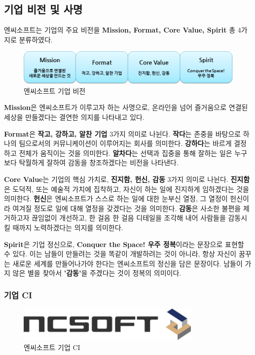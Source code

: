 \documentclass[11pt]{oblivoir}
\begin{document}
		\subsection{기업 비전 및 사명}
			엔씨소프트는 기업의 주요 비전을 \textbf{Mission, Format, Core Value, Spirit} 총 4가지로 분류하였다. 
			\begin{figure}[htbp]
				\centering
				\includegraphics[width=1\textwidth]{vision.png}
				\caption{엔씨소프트 기업 비전}
			\end{figure}

			\textbf{Mission}은 엔씨소프트가 이루고자 하는 사명으로, 온라인을 넘어 즐거움으로 연결된 세상을 만들겠다는 결연한 의지를 나타내고 있다.
			
			\textbf{Format}은 \textbf{작고, 강하고, 알찬 기업} 3가지 의미로 나뉜다. 
			\textbf{작다}는 존중을 바탕으로 하나의 팀으로서의 커뮤니케이션이 이루어지는 회사를 의미한다. \textbf{강하다}는 바르게 결정하고 전체가 움직이는 것을 의미한다. \textbf{알차다}는 선택과 집중을 통해 잘하는 일은 누구보다 탁월하게 잘하여 감동을 창조하겠다는 비전을 나타낸다.
			
			\textbf{Core Value}는 기업의 핵심 가치로, \textbf{진지함, 헌신, 감동} 3가지 의미로 나뉜다. \textbf{진지함}은 도덕적, 또는 예술적 가치에 집착하고, 자신이 하는 일에 진지하게 임하겠다는 것을 의미한다. \textbf{헌신}은 엔씨소프트가 스스로 하는 일에 대한 눈부신 열정, 그 열정이 헌신이라 여겨질 정도로 일에 대해 열정을 갖겠다는 것을 의미한다. \textbf{감동}은 사소한 불편을 제거하고자 끊임없이 개선하고, 한 걸음 한 걸음 디테일을 조각해 내어 사람들을 감동시킬 때까지 노력하겠다는 의지를 의미한다.
			
			\textbf{Spirit}은 기업 정신으로, \textbf{Conquer the Space! 우주 정복}이라는 문장으로 표현할 수 있다. 이는 남들이 만들려는 것을 똑같이 개발하려는 것이 아니라, 항상 자신이 꿈꾸는 새로운 세계를 만들어나가야 한다는 엔씨소프트의 정신을 담은 문장이다. 남들이 가지 않은 별을 찾아서 \textbf{'감동'}을 주겠다는 것이 정복의 의미이다.

		\subsubsection{기업 CI}
			\begin{figure}[htbp]
				\centering
				\includegraphics[width=0.8\textwidth]{ci.png}
				\caption{엔씨소프트 기업 CI}
			\end{figure}
			
\end{document}
